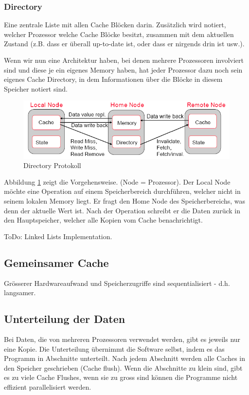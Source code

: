 \subsubsection{Directory}
Eine zentrale Liste mit allen Cache Blöcken darin. Zusätzlich wird notiert, welcher Prozessor welche Cache Blöcke besitzt, zusammen mit dem aktuellen Zustand (z.B. dass er überall up-to-date ist, oder dass er nirgends drin ist usw.).

Wenn wir nun eine Architektur haben, bei denen mehrere Prozessoren involviert sind und diese je ein eigenes Memory haben, hat jeder Prozessor dazu noch sein eigenes Cache Directory, in dem Informationen über die Blöcke in diesem Speicher notiert sind.

\begin{figure}
\centering
\includegraphics[width=0.7\linewidth]{fig/directory_protocol}
\caption{Directory Protokoll}
\label{fig:directory_protocol}
\end{figure}

Abbildung \ref{fig:directory_protocol} zeigt die Vorgehensweise. (Node = Prozessor). Der Local Node möchte eine Operation auf einem Speicherbereich durchführen, welcher nicht in seinem lokalen Memory liegt. Er fragt den Home Node des Speicherbereichs, was denn der aktuelle Wert ist. Nach der Operation schreibt er die Daten zurück in den Hauptspeicher, welcher alle Kopien vom Cache benachrichtigt. 

ToDo: Linked Lists Implementation.

\subsection{Gemeinsamer Cache}
Grösserer Hardwareaufwand und Speicherzugriffe sind sequentialisiert -  d.h. langsamer.
\subsection{Unterteilung der Daten}
Bei Daten, die von mehreren Prozessoren verwendet werden, gibt es jeweils nur eine Kopie. Die Unterteilung übernimmt die Software selbst, indem es das Programm in Abschnitte unterteilt. Nach jedem Abschnitt werden alle Caches in den Speicher geschrieben (Cache flush). Wenn die Abschnitte zu klein sind, gibt es zu viele Cache Flushes, wenn sie zu gross sind können die Programme nicht effizient parallelisiert werden.


